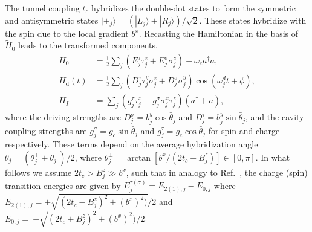 \documentclass[%
 reprint,
 amsmath,amssymb,
 aps,
prl,
longbibliography
]{revtex4-1}
\begin{document}
The tunnel coupling $t_c$ hybridizes the double-dot states to form the symmetric and antisymmetric states $|\pm_j\rangle=(|L_j\rangle\pm|R_j\rangle)/\sqrt{2}$. These states hybridize with the spin due to the local gradient $b^x$. Recasting the Hamiltonian in the basis of $\tilde{H}_0$ leads to the transformed components,
\begin{equation}
\begin{aligned}
    H_0 &=\frac{1}{2}\sum_j (E^\tau_j\tau^z_j + E^\sigma_j\sigma^z_j) + \omega_c a^\dagger a,\\
    H_\text{d}(t) &= \frac{1}{2}\sum_j (D^\tau_j \tau^y_j\sigma^z_j+D^\sigma_j\sigma_j^y) \cos(\omega^d_j t+\phi),\\
    H_I &= \sum_j (g^\tau_j \tau^x_j- g^\sigma_j\sigma^x_j\tau^z_j)(a^\dagger + a),
\end{aligned}
\end{equation}
where the driving strengths are $D^{\sigma}_j= b^y_j \cos\bar{\theta}_j$ and $D^{\tau}_j=b^{y}_j \sin\bar{\theta}_j$, and the cavity coupling strengths are $g^\sigma_j=g_c\sin\bar{\theta}_j$ and $g^\tau_j=g_c\cos\bar{\theta}_j$ for spin and charge respectively. These terms depend on the average hybridization angle $\bar{\theta}_j=(\theta^+_j+\theta^-_j)/2$, where $\theta^\pm_j=\arctan [b^x/(2t_c \pm B^z_j)] \in [0,\pi]$. In what follows we assume $2t_c > B^z_j \gg b^x$, such that in analogy to Ref.~\cite{Benito2019a},
the charge (spin) transition energies are given by $E^{\tau(\sigma)}_j = E_{2(1),j}-E_{0,j}$ where
$E_{2(1),j} = \pm\sqrt{(2t_c-B^z_j)^2+(b^x)^ 2)}/2$ and
$E_{0,j} =~{ -\sqrt{(2t_c+B^z_j)^2+(b^x)^2)}/2}$.
\end{document}
